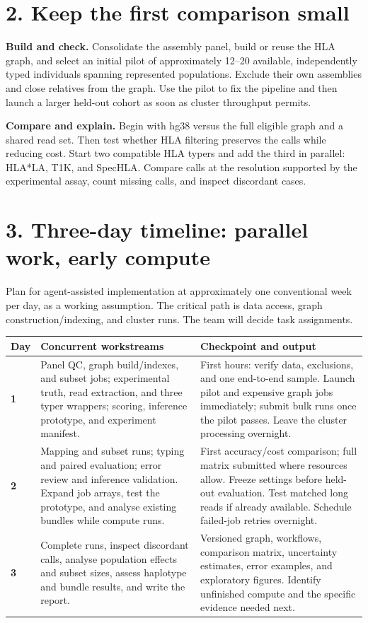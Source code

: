 \documentclass[11pt,a4paper]{article}
\begin{document}
\section*{2. Keep the first comparison small}
\textbf{Build and check.} Consolidate the assembly panel, build or reuse the HLA
graph, and select an initial pilot of approximately 12--20 available, independently typed
individuals spanning represented populations. Exclude their own assemblies and
close relatives from the graph. Use the pilot to fix the pipeline and then launch a larger held-out cohort
as soon as cluster throughput permits.

\textbf{Compare and explain.} Begin with hg38 versus the full eligible graph and
a shared read set. Then test whether HLA filtering preserves the calls while
reducing cost. Start two compatible HLA typers and add the third in parallel: HLA*LA, T1K,
and SpecHLA. Compare calls at the resolution supported by the experimental assay,
count missing calls, and inspect discordant cases.

\newpage
\section*{3. Three-day timeline: parallel work, early compute}
Plan for agent-assisted implementation at approximately one conventional week
per day, as a working assumption. The critical path is data access, graph
construction/indexing, and cluster runs. The team will decide task assignments.

\renewcommand{\arraystretch}{1.12}
\begin{tabularx}{\textwidth}{@{}p{1.0cm}XX@{}}
\toprule
Day & Concurrent workstreams & Checkpoint and output \\
\midrule
\textbf{1} & Panel QC, graph build/indexes, and subset jobs; experimental
truth, read extraction, and three typer wrappers; scoring, inference prototype,
and experiment manifest.
& First hours: verify data, exclusions, and one end-to-end sample. Launch pilot
and expensive graph jobs immediately; submit bulk runs once the pilot passes.
Leave the cluster processing overnight. \\
\addlinespace
\textbf{2} & Mapping and subset runs; typing and paired evaluation; error
review and inference validation. Expand job arrays, test the prototype, and
analyse existing bundles while compute runs.
& First accuracy/cost comparison; full matrix submitted where resources allow.
Freeze settings before held-out evaluation. Test matched long reads if already
available. Schedule failed-job retries overnight. \\
\addlinespace
\textbf{3} & Complete runs, inspect discordant
calls, analyse population effects and subset sizes, assess haplotype and bundle
results, and write the report.
& Versioned graph, workflows, comparison matrix, uncertainty estimates,
error examples, and exploratory figures. Identify unfinished compute and the
specific evidence needed next. \\
\bottomrule
\end{tabularx}
\end{document}
